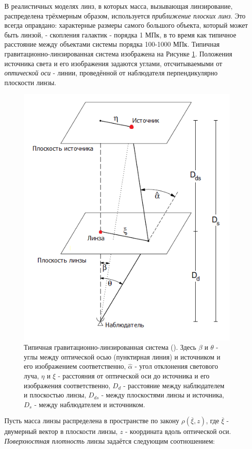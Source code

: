 В реалистичных моделях линз, в которых масса, вызывающая линзирование, распределена трёхмерным образом, используется \textit{приближение плоских линз}. Это всегда оправдано: характерные размеры самого большого объекта, который может быть линзой, - скопления галактик - порядка 1 МПк, в то время как типичное расстояние между объектами системы порядка 100-1000 МПк.
Типичная гравитационно-линзированная система изображена на Рисунке \ref{fig:gravlensfig}. Положения источника света и его изображения задаются углами, отсчитываемыми от \textit{оптической оси} - линии, проведённой от наблюдателя перпендикулярно плоскости линзы.

\begin{figure}[H]
    \centering
	\includegraphics[scale=1.0]{pics/gravlenssyst.png}
	\caption{Типичная гравитационно-линзированная система (\cite{gravlensbook}). Здесь $\beta$ и $\theta$ - углы между оптической осью (пунктирная линия) и источником и его изображением соответственно, $\hat{\alpha}$ - угол отклонения светового луча, $\eta$ и $\xi$ - расстояния от оптической оси до источника и его изображения соответственно,  $D_d$ - расстояние между наблюдателем и плоскостью линзы, $D_{ds}$ - между плоскостями линзы и источника, $D_s$ - между наблюдателем и источником.\label{fig:gravlensfig} }
   \end{figure} 
Пусть масса линзы распределена в пространстве по закону $\rho(\overline \xi, z)$, где $\overline \xi$ - двумерный вектор в плоскости линзы, $z$ - координата вдоль оптической оси. \textit{Поверхностная плотность} линзы задаётся следующим соотношением:

